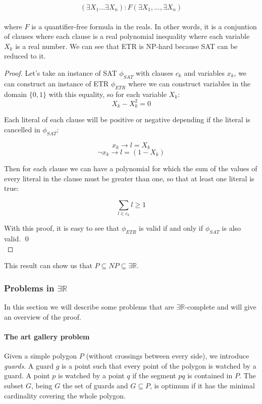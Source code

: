 $$(\exists X_1 \dots \exists X_n): F(\exists X_1, \dots,\exists X_n)$$\\

where $F$ is a quantifier-free formula in the reals. In other words, it is a
conjuntion of clauses where each clause is a real polynomial inequality where
each variable $X_k$ is a real number. We can see that ETR is NP-hard because
SAT can be reduced to it.


\begin{proof}
  Let's take an instance of SAT $\phi_{SAT}$ with clauses $c_k$ and variables
  $x_k$, we can construct an instance of ETR $\phi_{ETR}$ where we can
  construct variables in the domain $\{0,1\}$ with this equality, so for each
  variable $X_k$:
  $$X_k - X_k^2 = 0$$

  Each literal of each clause will be positive or negative depending if the literal is cancelled in $\phi_{SAT}$:

  $$x_k \to l = X_k$$
  $$\neg x_k \to l = (1-X_k)$$

  Then for each clause we can have a polynomial for which the sum of the values of every
  literal in the clause must be greater than one, so that at least one literal is true:

  $$\sum_{l\in c_k} l \geq 1$$

  With this proof, it is easy to see that $\phi_{ETR}$ is valid if and only if $\phi_{SAT}$ is also valid.  \qed\\

\end{proof}

This result can show us that $P \subseteq NP \subseteq \exists \mathbb{R}$.

\subsubsection{Problems in $\exists \mathbb{R}$}

In this section we will describe some problems that are $\exists
\mathbb{R}$-complete and will give an overview of the proof.

\paragraph{The art gallery problem} Given a simple polygon $P$ (without
crossings between every side), we introduce \textit{guards}. A guard
$g$ is a point such that every point of the polygon is watched by a guard.
A point $p$ is watched by a point $q$ if the segment $pq$ is contained
in $P$. The subset $G$, being $G$ the set of guards and $G \subseteq
P$, is optimum if it has the minimal cardinality covering the whole
polygon.

